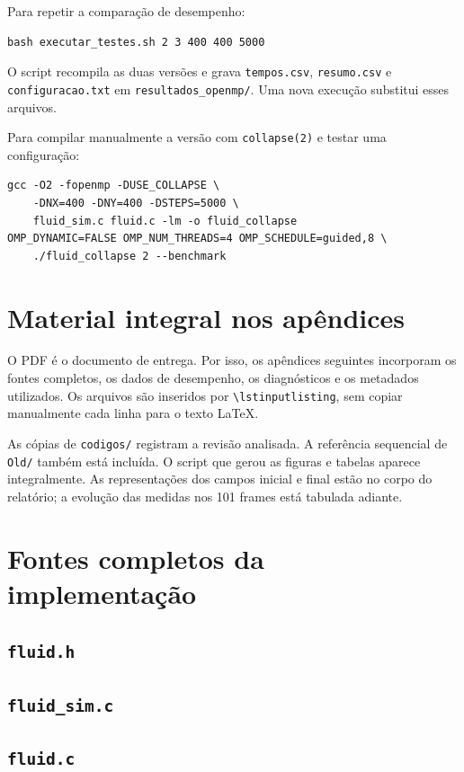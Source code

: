 \documentclass[12pt,a4paper]{article}
\begin{document}
Para repetir a comparação de desempenho:
\begin{lstlisting}[style=Terminal]
bash executar_testes.sh 2 3 400 400 5000
\end{lstlisting}
O script recompila as duas versões e grava \texttt{tempos.csv}, \texttt{resumo.csv} e \texttt{configuracao.txt} em \texttt{resultados\_openmp/}. Uma nova execução substitui esses arquivos.

Para compilar manualmente a versão com \texttt{collapse(2)} e testar uma configuração:
\begin{lstlisting}[style=Terminal]
gcc -O2 -fopenmp -DUSE_COLLAPSE \
    -DNX=400 -DNY=400 -DSTEPS=5000 \
    fluid_sim.c fluid.c -lm -o fluid_collapse
OMP_DYNAMIC=FALSE OMP_NUM_THREADS=4 OMP_SCHEDULE=guided,8 \
    ./fluid_collapse 2 --benchmark
\end{lstlisting}

\section{Material integral nos apêndices}
O PDF é o documento de entrega. Por isso, os apêndices seguintes incorporam os fontes completos, os dados de desempenho, os diagnósticos e os metadados utilizados. Os arquivos são inseridos por \texttt{\textbackslash lstinputlisting}, sem copiar manualmente cada linha para o texto LaTeX.

As cópias de \texttt{codigos/} registram a revisão analisada. A referência sequencial de \texttt{Old/} também está incluída. O script que gerou as figuras e tabelas aparece integralmente. As representações dos campos inicial e final estão no corpo do relatório; a evolução das medidas nos 101 frames está tabulada adiante.

\clearpage
\section{Fontes completos da implementação}
\label{ap:fontes}
\subsection{\texttt{fluid.h}}

\clearpage
\subsection{\texttt{fluid\_sim.c}}

\clearpage
\subsection{\texttt{fluid.c}}

\clearpage
\end{document}
